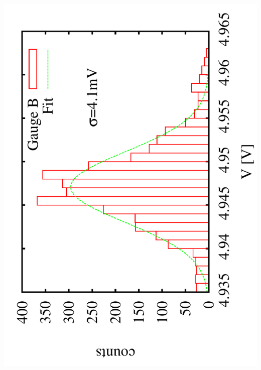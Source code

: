 \documentclass[a4paper,11pt]{book}
\begin{document}
 \includegraphics[scale=0.15,angle=-90]{image_ai_24e7.pdf}\par
 
\end{document}
